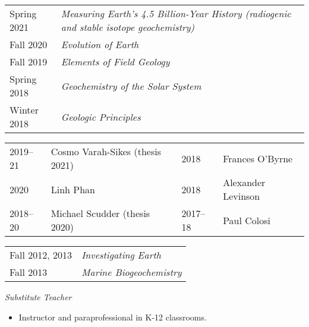 \begin{tabular}{p{.15\linewidth} >{\itshape}l}
	Spring 2021 & Measuring Earth’s 4.5 Billion-Year History \normalfont(radiogenic and stable isotope geochemistry)\\
	Fall 2020 & Evolution of Earth\\
	Fall 2019 & Elements of Field Geology\\
	Spring 2018 & Geochemistry of the Solar System\\
	Winter 2018 & Geologic Principles
\end{tabular}

\begin{tabular}{ll | ll}
	2019--21 & Cosmo Varah-Sikes (thesis 2021) &
	2018 & Frances O'Byrne\\
	2020 & Linh Phan &
	2018 & Alexander Levinson \\
	2018--20 & Michael Scudder (thesis 2020) &
	2017--18 & Paul Colosi
\end{tabular}

\begin{tabular}{p{.15\linewidth} l} %
Fall 2012, 2013 & \textit{Investigating Earth}\\
Fall 2013 & \textit{Marine Biogeochemistry}
\end{tabular}

\textit{Substitute Teacher}
\begin{itemize}
	\item Instructor and paraprofessional in K-12 classrooms.
\end{itemize}